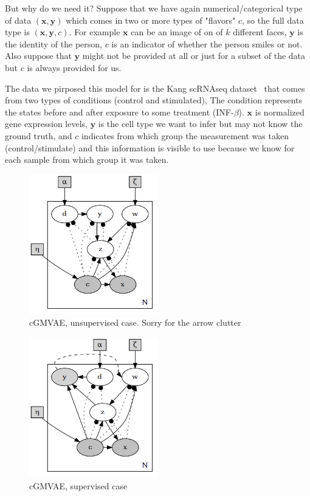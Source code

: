 \documentclass[11pt, a4paper]{report}
\theoremstyle{plain}
\theoremstyle{definition}
\theoremstyle{remark}
\newcommand{\x}{\mathbf{x}}
\newcommand{\y}{\mathbf{y}}
\begin{document}
But why do we need it?
Suppose that we have again numerical/categorical type of data $(\x, \y)$ which 
comes in two or more types of "flavors" $c$, so the full data type 
is $(\x, \y, c)$. For example $\x$ can be an image of on of $k$ 
different faces, 
$\y$ is the identity of the person, $c$ is an indicator of whether the person
smiles or not. 
Also suppose that $\y$ might not be provided at all or just for
a subset of the data but $c$ is always provided for us.

The data we pirposed this model for is the Kang scRNAseq
dataset~\cite{kang2018multiplexed} that comes from two types 
of conditions (control and stimulated), 
The condition represents the states before and after exposure to some treatment
(INF-$\beta$).
$\x$ is normalized gene expression levels, $\y$ is the cell type 
we want to infer but may not know the ground truth, and $c$ indicates from which
group the measurement was taken (control/stimulate) and this information is
visible to use because we know for each sample from which group it was
taken.


\begin{figure}[h]
\centering
\includegraphics[width=0.5\textwidth]{plots/dirichlet_gmm_cvae.v2.gv.png}
\caption{cGMVAE, unsupervised case. Sorry for the arrow clutter}
\label{fig:dirgmmcvae}
\end{figure}

\begin{figure}[h]
\centering
\includegraphics[width=0.5\textwidth]{plots/dirichlet_gmm_cvae_supervised.v2.gv.png}
\caption{cGMVAE, supervised case}
\label{fig:dirgmmcvae_super}
\end{figure}
\end{document}
